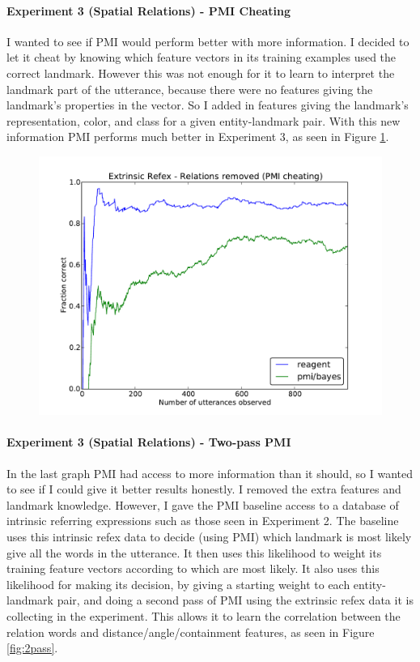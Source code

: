 \documentclass[12pt]{article}
\begin{document}
\paragraph{Experiment 3 (Spatial Relations) - PMI Cheating}
I wanted to see if PMI would perform better with more information. I decided to let it cheat by knowing which feature vectors in its training examples used the correct landmark. However this was not enough for it to learn to interpret the landmark part of the utterance, because there were no features giving the landmark's properties in the vector. So I added in features giving the landmark's representation, color, and class for a given entity-landmark pair. With this new information PMI performs much better in Experiment 3, as seen in Figure \ref{fig:cheating}.
\begin{figure}[h!]
\centering
\includegraphics[scale=0.7]{grammar/4_extrinsic_refex_relations_pmi_cheating.pdf}
\caption{\label{fig:cheating}}
\end{figure}
\newpage
\paragraph{Experiment 3 (Spatial Relations) - Two-pass PMI}
In the last graph PMI had access to more information than it should, so I wanted to see if I could give it better results honestly. I removed the extra features and landmark knowledge. However, I gave the PMI baseline access to a database of intrinsic referring expressions such as those seen in Experiment 2. The baseline uses this intrinsic refex data to decide (using PMI) which landmark is most likely give all the words in the utterance. It then uses this likelihood to weight its training feature vectors according to which are most likely. It also uses this likelihood for making its decision, by giving a starting weight to each entity-landmark pair, and doing a second pass of PMI using the extrinsic refex data it is collecting in the experiment. This allows it to learn the correlation between the relation words and distance/angle/containment features, as seen in Figure \ref{fig:2pass}.
\end{document}
